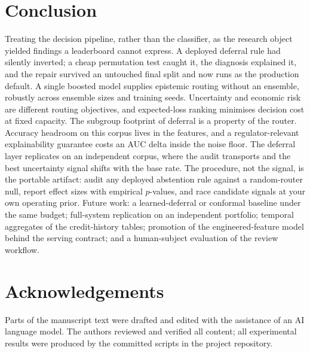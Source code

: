 \documentclass[conference]{IEEEtran}
\begin{document}
\section{Conclusion}
Treating the decision pipeline, rather than the classifier, as the research
object yielded findings a leaderboard cannot express. A deployed deferral
rule had silently inverted; a cheap permutation test caught it, the
diagnosis explained it, and the repair survived an untouched final split
and now runs as the production default. A single boosted model supplies
epistemic routing without an ensemble, robustly across ensemble sizes and
training seeds. Uncertainty and economic risk are different routing
objectives, and expected-loss ranking minimises decision cost at fixed
capacity. The subgroup footprint of deferral is a property of the router.
Accuracy headroom on this corpus lives in the features, and a
regulator-relevant explainability guarantee costs an AUC delta inside the
noise floor. The deferral layer replicates on an independent corpus, where
the audit transports and the best uncertainty signal shifts with the base
rate. The procedure, not the signal, is the portable artifact: audit any
deployed abstention rule against a random-router null, report effect sizes
with empirical $p$-values, and race candidate signals at your own operating
prior. Future work: a learned-deferral or conformal baseline under the
same budget; full-system replication on an independent portfolio; temporal
aggregates of the credit-history tables; promotion of the
engineered-feature model behind the serving contract; and a human-subject
evaluation of the review workflow.

\section*{Acknowledgements}
Parts of the manuscript text were drafted and edited with the assistance of
an AI language model. The authors reviewed and verified all content; all
experimental results were produced by the committed scripts in the project
repository.
\end{document}
